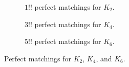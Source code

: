 \begin{figure}
\centering

\begin{subfigure}[b]{\columnwidth}
\centering

\caption{$1!!$ perfect matchings for $K_2$.}
\end{subfigure}%

\begin{subfigure}[b]{\columnwidth}
\centering

\caption{$3!!$ perfect matchings for $K_4$. \label{fig:pmthree}}
\end{subfigure}%

\begin{subfigure}[b]{\columnwidth}
\centering

\caption{$5!!$ perfect matchings for $K_6$.}
\end{subfigure}%

\caption{Perfect matchings for $K_2$, $K_4$, and $K_6$.\label{fig:ch2:perfectmatchings}}

\end{figure}